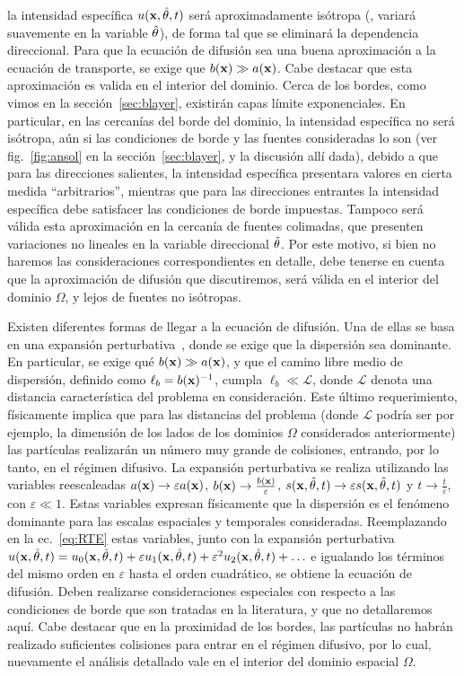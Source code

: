 la intensidad específica $u(\mathbf{x},\hat{\theta},t)$ será aproximadamente 
isótropa (\ie, variará suavemente en la variable $\hat{\theta}$), 
de forma tal que se eliminará la dependencia direccional. Para que la 
ecuación de difusión sea una buena aproximación a la ecuación de 
transporte, se exige que $b(\mathbf{x})\gg a(\mathbf{x})$. Cabe destacar que esta aproximación 
es valida en el interior del dominio. Cerca de los bordes, como vimos en la sección~\ref{sec:blayer}, existirán capas límite exponenciales. 
En particular, en las cercanías del borde del dominio, la intensidad específica no será isótropa, 
aún si las condiciones de borde y las fuentes consideradas lo son (ver fig.~\ref{fig:ansol} 
en la sección~\ref{sec:blayer}, y la discusión allí dada), 
debido a que para las direcciones salientes, la intensidad específica 
presentara valores en cierta medida ``arbitrarios'', mientras que 
para las direcciones entrantes la intensidad específica debe satisfacer 
las condiciones de borde impuestas. Tampoco será válida esta 
aproximación en la cercanía de fuentes colimadas, que presenten variaciones no lineales en la variable 
direccional $\hat{\theta}$. Por este motivo, si bien no haremos las consideraciones correspondientes 
en detalle, debe tenerse en cuenta que la aproximación de difusión que discutiremos, 
será válida en el interior del dominio $\Omega$, y lejos de fuentes no isótropas. 

Existen diferentes formas 
de llegar a la ecuación de difusión. Una de ellas se basa en  una expansión perturbativa~\cite{Larsen1974,Larsen1987,Arridge2009}, 
donde se exige que la dispersión sea dominante. En particular, se exige qué $b(\mathbf{x}) \gg a(\mathbf{x})$, 
y que el camino libre medio de dispersión, definido como $\ell_b=b(\mathbf{x})^{-1}$, cumpla $\ell_b\ll \mathcal{L}$, 
donde $\mathcal{L}$ denota una distancia característica del problema en consideración. 
Este último requerimiento, físicamente implica que para las distancias del problema (donde $\mathcal{L}$ 
podría ser por ejemplo, la dimensión de los lados de los dominios $\Omega$ considerados anteriormente) las partículas realizarán un número muy grande de colisiones, entrando, por lo tanto, en el régimen difusivo. La expansión perturbativa se realiza utilizando las variables 
reescaleadas $a(\mathbf{x}) \rightarrow \varepsilon a(\mathbf{x})$, $b(\mathbf{x}) \rightarrow \frac{b(\mathbf{x})}{\varepsilon}$, $s(\mathbf{x},\hat{\theta},t)\rightarrow  \varepsilon s(\mathbf{x},\hat{\theta},t)$ y $t\rightarrow \frac{t}{\varepsilon}$, con $\varepsilon \ll 1$. Estas variables  expresan físicamente que la dispersión es el fenómeno dominante para las 
escalas espaciales y temporales consideradas. Reemplazando en la ec.~\eqref{eq:RTE} estas variables, junto con la expansión perturbativa $u(\mathbf{x},\hat{\theta},t)=u_0(\mathbf{x},\hat{\theta},t)+\varepsilon u_1(\mathbf{x},\hat{\theta},t)+\varepsilon^2 u_2(\mathbf{x},\hat{\theta},t)+\ldots$ e igualando los términos del mismo orden en $\varepsilon$ 
hasta el orden cuadrático, se obtiene la ecuación de difusión. Deben realizarse consideraciones especiales con respecto a las condiciones de 
borde que son tratadas en la literatura, y que no detallaremos aquí. Cabe destacar que en la proximidad de los bordes, las partículas no habrán realizado suficientes colisiones para entrar en el régimen difusivo, por lo cual, nuevamente el análisis detallado vale en el interior del dominio espacial $\Omega$. 

